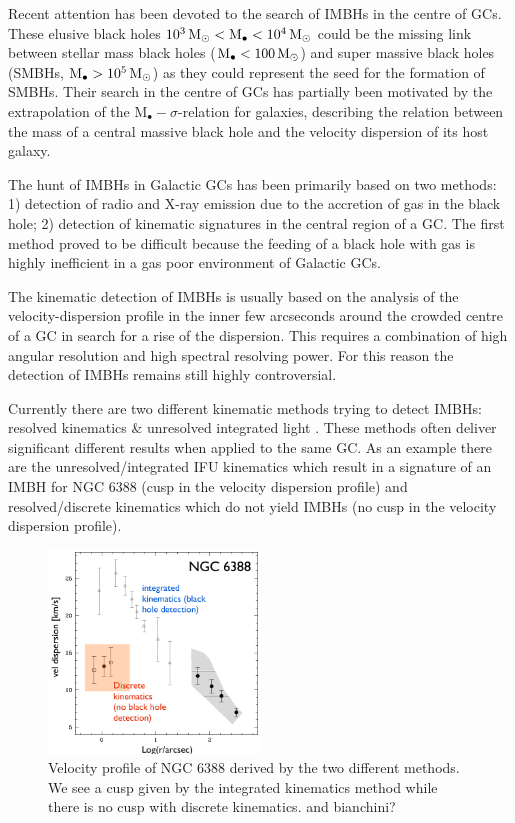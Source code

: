 \par Recent attention has been devoted to the search of \acp{IMBH} in the centre of \acp{GC}. These elusive black holes \(\unit[10^3]{\mathrm{M}_\odot} < \mathrm{M}_\bullet < \unit[10^4]{\mathrm{M}_\odot}\) could be the missing link between stellar mass black holes (\(\mathrm{M}_\bullet < \unit[100]{\mathrm{M}_\odot}\)) and super massive black holes (\acsp{SMBH}, \(\mathrm{M}_\bullet > \unit[10^5]{\mathrm{M}_\odot}\)) as they could represent the seed for the formation of \acp{SMBH}. Their search in the centre of \acp{GC} has partially been motivated by the extrapolation of the \(\mathrm{M}_\bullet-\sigma\)-relation for galaxies, describing the relation between the mass of a central massive black hole and the velocity dispersion of its host galaxy.
\par The hunt of \acp{IMBH} in Galactic \acp{GC} has been primarily based on two methods: 1) detection of radio and X-ray emission due to the accretion of gas in the black hole; 2) detection of kinematic signatures in the central region of a \ac{GC}. The first method proved to be difficult because the feeding of a black hole with gas is highly inefficient in a gas poor environment of Galactic \acp{GC}. 
\par The kinematic detection of \acp{IMBH} is usually based on the analysis of the velocity-dispersion profile in the inner few arcseconds around the crowded centre of a \ac{GC} in search for a rise of the dispersion. This requires a combination of high angular resolution and high spectral resolving power. For this reason the detection of \acp{IMBH} remains still highly controversial. 
\par Currently there are two different kinematic methods trying to detect \acp{IMBH}: resolved kinematics \& unresolved integrated light \cite{2015MNRAS.453..365B}. These methods often deliver significant different results when applied to the same \ac{GC}. As an example there are the unresolved/integrated IFU kinematics which result in a signature of an \ac{IMBH} for NGC 6388 (cusp in the velocity dispersion profile) and resolved/discrete kinematics which do not yield \acp{IMBH} (no cusp in the velocity dispersion profile). 
\begin{figure}
\centering
\includegraphics[width=0.5\textwidth]{Plots/Paolo_talk_plot.png}
\caption{Velocity profile of NGC 6388 derived by the two different methods. We see a cusp given by the integrated kinematics method while there is no cusp with discrete kinematics. \citep{2013ApJ...769..107L} \color{red}and bianchini?\color{black}}
\label{fig:NGC6388}
\end{figure}\
